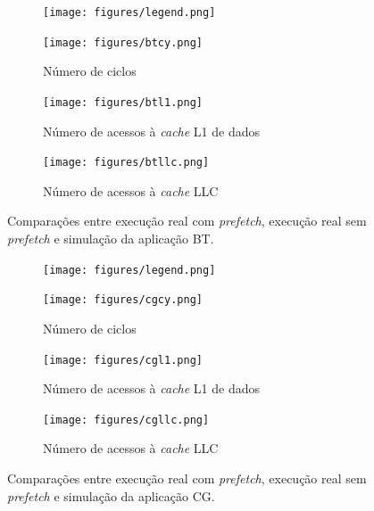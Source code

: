\documentclass[12pt]{article}
\begin{document}
\begin{figure}[t!]
  \hspace{+25mm}
  \begin{subfigure}{0.33\textwidth}
    \centering
        \texttt{[image: figures/legend.png]}
    \label{fig:btleg}
  \end{subfigure}
  \vspace{-5mm}

  \begin{subfigure}{0.33\textwidth}
    \centering
    \vspace{-4.5mm}
        \texttt{[image: figures/btcy.png]}
    \caption{Número de ciclos}
    \label{fig:btcycles}
  \end{subfigure}%
  \begin{subfigure}{0.33\textwidth}
    \centering	
        \texttt{[image: figures/btl1.png]}
    \caption{Número de acessos à \textit{cache} L1 de dados}
    \label{fig:btl1}
  \end{subfigure}%
  \begin{subfigure}{0.33\textwidth}
    \centering	
        \texttt{[image: figures/btllc.png]}
    \caption{Número de acessos à \textit{cache} LLC}
    \label{fig:btllc}
  \end{subfigure}
  
  \caption{Comparações entre execução real com \textit{prefetch}, execução real sem \textit{prefetch} e simulação da aplicação BT.}
  \label{ref:bt}
\end{figure}

\begin{figure}[t!]
  \hspace{+25mm}
  \begin{subfigure}{0.33\textwidth}
    \centering
        \texttt{[image: figures/legend.png]}
    \label{fig:cgleg}
  \end{subfigure}
  \vspace{-5mm}

  \begin{subfigure}{0.33\textwidth}
    \centering
    \vspace{-4.mm}
        \texttt{[image: figures/cgcy.png]}
    \caption{Número de ciclos}
    \label{fig:cgcycles}
  \end{subfigure}%
  \begin{subfigure}{0.33\textwidth}
    \centering	
        \texttt{[image: figures/cgl1.png]}
    \caption{Número de acessos à \textit{cache} L1 de dados}
    \label{fig:cgl1}
  \end{subfigure}%
  \begin{subfigure}{0.33\textwidth}
    \centering	
        \texttt{[image: figures/cgllc.png]}
    \caption{Número de acessos à \textit{cache} LLC}
    \label{fig:cgllc}
  \end{subfigure}
  
  \caption{Comparações entre execução real com \textit{prefetch}, execução real sem \textit{prefetch} e simulação da aplicação CG.}
  \label{ref:cg}
\end{figure}
\end{document}
